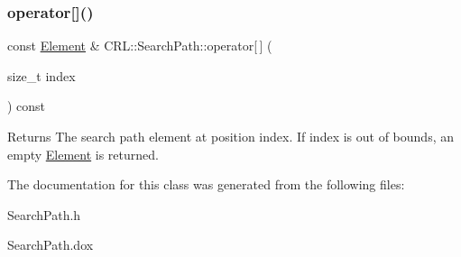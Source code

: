 \subsubsection{\texorpdfstring{operator[]()}{operator[]()}}
{\footnotesize\ttfamily const \mbox{\hyperlink{classCRL_1_1SearchPath_1_1Element}{Element}} \& C\+R\+L\+::\+Search\+Path\+::operator\mbox{[}$\,$\mbox{]} (\begin{DoxyParamCaption}\item[{size\+\_\+t}]{index }\end{DoxyParamCaption}) const}

\begin{DoxyReturn}{Returns}
The search path element at position {\ttfamily index}. If {\ttfamily index} is out of bounds, an empty \mbox{\hyperlink{classCRL_1_1SearchPath_1_1Element}{Element}} is returned. 
\end{DoxyReturn}


The documentation for this class was generated from the following files\+:\begin{DoxyCompactItemize}
\item 
Search\+Path.\+h\item 
Search\+Path.\+dox\end{DoxyCompactItemize}
